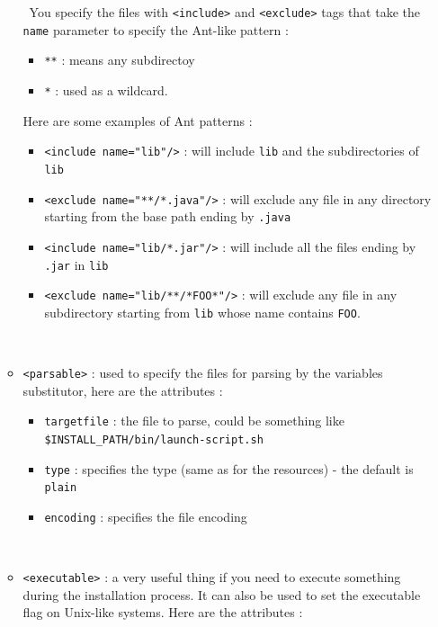 \begin{itemize}
\begin{itemize}
\begin{itemize}
    \end{itemize}\
    You specify the files with  \texttt{<include>} and \texttt{<exclude>} tags
    that take the \texttt{name} parameter to specify the Ant-like pattern :
    \begin{itemize}    
      \item \texttt{**} : means any subdirectoy
      \item \texttt{*} : used as a wildcard.
    \end{itemize}
    Here are some examples of Ant patterns :
    \begin{itemize}
    
      \item \texttt{<include name="lib"/>} : will include \texttt{lib} and the
      subdirectories of \texttt{lib}
      \item \texttt{<exclude name="**/*.java"/>} : will exclude any file in any
      directory starting from the base path ending by \texttt{.java}
      \item \texttt{<include name="lib/*.jar"/>} : will include all the files
      ending by \texttt{.jar} in \texttt{lib}
      \item \texttt{<exclude name="lib/**/*FOO*"/>} : will exclude any file in
      any subdirectory starting from \texttt{lib} whose name contains
      \texttt{FOO}.
    
    \end{itemize}\
    \item \texttt{<parsable>} : used to specify the files for parsing by the
    variables substitutor, here are the attributes :
    \begin{itemize}
    
      \item \texttt{targetfile} : the file to parse, could be something like\\
      \texttt{\$INSTALL\_PATH/bin/launch-script.sh}
      \item \texttt{type} : specifies the type (same as for the resources) -
      the default is \texttt{plain}
      \item \texttt{encoding} : specifies the file encoding
    
    \end{itemize}\
    \item \texttt{<executable>} : a very useful thing if you need to execute
    something during the installation process. It can also be used to set
    the executable flag on Unix-like systems. Here are the attributes :
    \begin{itemize}
    

\end{itemize}
\end{itemize}
\end{itemize}
